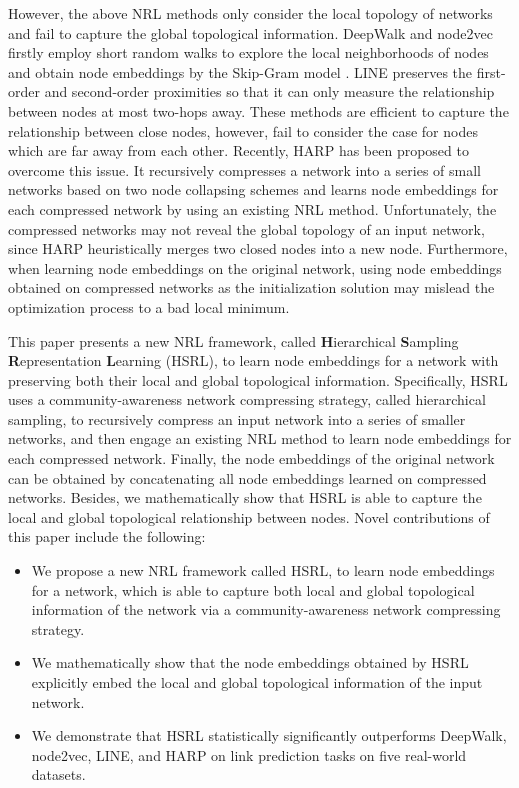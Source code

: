 \documentclass[conference]{IEEEtran}
\begin{document}
However, the above NRL methods only consider the local topology of networks and fail to capture the global topological information. DeepWalk and node2vec firstly employ short random walks to explore the local neighborhoods of nodes and obtain node embeddings by the Skip-Gram model \cite{mikolov2013distributed}. LINE preserves the first-order and second-order proximities so that it can only measure the relationship between nodes at most two-hops away. These methods are efficient to capture the relationship between close nodes, however, fail to consider the case for nodes which are far away from each other. Recently, HARP \cite{chen2018harp} has been proposed to overcome this issue. It recursively compresses a network into a series of small networks based on two node collapsing schemes and learns node embeddings for each compressed network by using an existing NRL method. Unfortunately, the compressed networks may not reveal the global topology of an input network, since HARP heuristically merges two closed nodes into a new node. Furthermore, when learning node embeddings on the original network, using node embeddings obtained on compressed networks as the initialization solution may mislead the optimization process to a bad local minimum.

This paper presents a new NRL framework, called \textbf{H}ierarchical \textbf{S}ampling \textbf{R}epresentation \textbf{L}earning (HSRL), to learn node embeddings for a network with preserving both their local and global topological information. Specifically, HSRL uses a community-awareness network compressing strategy, called hierarchical sampling, to recursively compress an input network into a series of smaller networks, and then engage an existing NRL method to learn node embeddings for each compressed network. Finally, the node embeddings of the original network can be obtained by concatenating all node embeddings learned on compressed networks. Besides, we mathematically show that HSRL is able to capture the local and global topological relationship between nodes. Novel contributions of this paper include the following:
\begin{itemize}
	\item We propose a new NRL framework called HSRL, to learn node embeddings for a network, which is able to capture both local and global topological information of the network via a community-awareness network compressing strategy.
	
	\item We mathematically show that the node embeddings obtained by HSRL explicitly embed the local and global topological information of the input network.
	
	\item We demonstrate that HSRL statistically significantly outperforms DeepWalk, node2vec, LINE, and HARP on link prediction tasks on five real-world datasets.
\end{itemize}
\end{document}
